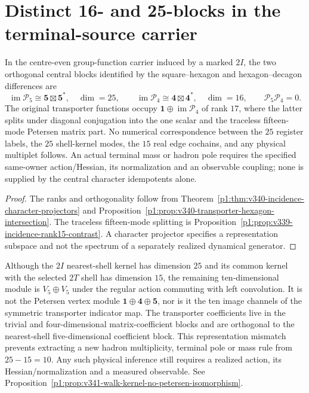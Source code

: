 \documentclass[12pt,a4paper]{article}
\begin{document}
\section{Distinct 16- and 25-blocks in the terminal-source carrier}
\label{p5b:sec:v340-ranktwo-terminal-firewall}
\begin{corollary}
\label{p5b:cor:v340-25-16-terminal-firewall}
In the centre-even group-function carrier induced by a marked
$2I$, the two orthogonal central blocks identified by the
square--hexagon and hexagon--decagon differences are
\[
 \operatorname{im}\mathscr P_5\cong\mathbf5\boxtimes\mathbf5^*,
 \quad\dim=25,\qquad
 \operatorname{im}\mathscr P_4\cong\mathbf4\boxtimes\mathbf4^*,
 \quad\dim=16,\qquad \mathscr P_5\mathscr P_4=0.
\]
The original transporter functions occupy
$\mathbf1\oplus\operatorname{im}\mathscr P_4$ of rank $17$,
where the latter splits under diagonal conjugation into the
one scalar and the traceless fifteen-mode Petersen matrix part.
No numerical correspondence between the $25$ register labels,
the $25$ shell-kernel modes, the $15$ real edge cochains, and
any physical multiplet follows. An actual terminal mass or hadron
pole requires the specified same-owner action/Hessian, its
normalization and an observable coupling; none is supplied by the
central character idempotents alone.
\end{corollary}
\begin{proof}
The ranks and orthogonality follow from
Theorem~\ref{p1:thm:v340-incidence-character-projectors} and
Proposition~\ref{p1:prop:v340-transporter-hexagon-intersection}.
The traceless fifteen-mode splitting is
Proposition~\ref{p1:prop:v339-incidence-rank15-contrast}.
A character projector specifies a representation subspace and not
the spectrum of a separately realized dynamical generator.
\end{proof}

\printbibliography

\begin{remark}
\label{p5b:rem:v341-kernel-petersen-nonidentification}
Although the $2I$ nearest-shell kernel has dimension $25$ and
its common kernel with the selected $2T$ shell has dimension
$15$, the remaining ten-dimensional module is $V_5\oplus V_5$
under the regular action commuting with left convolution.
It is not the Petersen vertex module
$\mathbf1\oplus\mathbf4\oplus\mathbf5$, nor is it the
ten image channels of the symmetric transporter indicator map.
The transporter coefficients live in the trivial and
four-dimensional matrix-coefficient blocks and are orthogonal to
the nearest-shell five-dimensional coefficient block.
This representation mismatch prevents extracting a new hadron
multiplicity, terminal pole or mass rule from $25-15=10$.
Any such physical inference still requires a realized action,
its Hessian/normalization and a measured observable.  See
Proposition~\ref{p1:prop:v341-walk-kernel-no-petersen-isomorphism}.
\end{remark}
\end{document}
